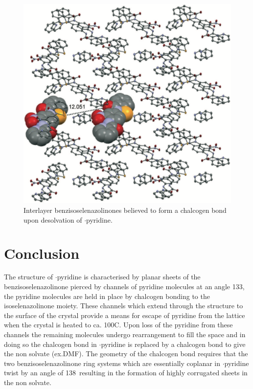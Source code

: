 \begin{refsection}
    \begin{figure}
        \centering
        \includegraphics[width=0.8\linewidth]{Figures/ebs-nitroamide-2py-transformation.pdf}
        \caption[Rearrangement of Ch-bonds upon desolvation.]{Interlayer benzisoselenazolinones  believed to form a  chalcogen bond upon desolvation of $\cdot$pyridine.}\label{fig:ebs-nitroamide-2py-transformation}
    \end{figure}
    
    \section{Conclusion}
    The structure of $\cdot$pyridine is characterised by planar sheets of the benzisoselenazolinone  pierced by channels of pyridine molecules at an angle 133\degree, the pyridine molecules are held in place by  chalcogen bonding to the isoselenazolinone moiety.
    These channels which extend through the structure to the surface of the crystal provide a means for escape of pyridine from the lattice when the crystal is heated to ca. 100\degree{}C.
    Upon loss of the pyridine from these channels the remaining molecules undergo rearrangement to fill the space and in doing so the  chalcogen bond in $\cdot$pyridine is replaced by a  chalcogen bond to give the non solvate (ex.DMF).
    The geometry of the chalcogen bond requires that the two benzisoselenazolinone ring systems which are essentially coplanar in $\cdot$pyridine twist by an angle of 138\degree~resulting in the formation of highly corrugated sheets in the non solvate.
    

\end{refsection}
